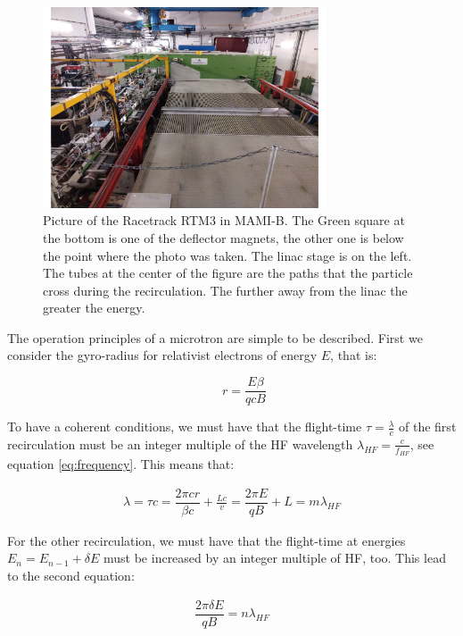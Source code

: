 \begin{figure}[hbtp]
\centering
\includegraphics[width=0.75\textwidth]{ExperimentalSetup/Racetrack.pdf}
\caption{Picture of the Racetrack RTM3 in MAMI-B. The Green square at the bottom is one of the deflector magnets, the other one is below the point where the photo was taken. The linac stage is on the left. The tubes at the center of the figure are the paths that the particle cross during the recirculation. The further away from the linac the greater the energy.}
\end{figure}

The operation principles of a microtron are simple to be described. First we consider the gyro-radius for relativist electrons of energy $E$, that is:

\begin{equation}
\qquad r = \dfrac{E \beta}{qcB}
\end{equation}

To have a coherent conditions, we must have that the flight-time $\tau = \frac{\lambda}{c}$ of the first recirculation must be an integer multiple of the HF wavelength $\lambda_{HF} = \frac{c}{f_{HF}}$, see equation \ref{eq:frequency}. This means that:

\begin{align*}
\lambda = \tau c =\dfrac{ 2 \pi c r }{\beta c} + \frac{Lc}{v} = \dfrac{2 \pi E}{q B} + L = m \lambda_{HF}
\end{align*}

For the other recirculation, we must have that the flight-time at energies $E_{n} = E_{n-1} + \delta E$ must be increased by an integer multiple of HF, too. This lead to the second equation:

\begin{align*}
\dfrac{2 \pi \delta E}{q B} = n \lambda_{HF}
\end{align*}

